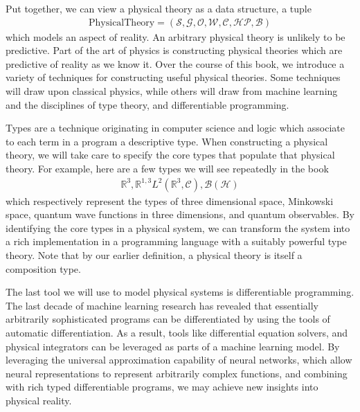 \documentclass[book.tex]{subfiles}
\begin{document}
Put together, we can view a physical theory as a data structure, a tuple 
\begin{align}
\textrm{PhysicalTheory} = (\mathcal{S}, \mathcal{G}, \mathcal{O}, \mathcal{W}, \mathcal{C}, \mathcal{HP}, \mathcal{B})
\end{align} 
which models an aspect of reality. An arbitrary physical theory is unlikely to be predictive. Part of the art of physics is constructing physical theories which are predictive of reality as we know it. Over the course of this book, we introduce a variety of techniques for constructing useful physical theories. Some techniques will draw upon classical physics, while others will draw from machine learning and the disciplines of type theory, and differentiable programming. 


Types are a technique originating in computer science and logic which associate to each term in a program a descriptive type. When constructing a physical theory, we will take care to specify the core types that populate that physical theory. For example, here are a few types we will see repeatedly in the book
\begin{align}
    \mathbb{R}^3, \mathbb{R}^{1,3} L^2(\mathbb{R}^3, \mathcal{C}), \mathcal{B}(\mathcal{H})
\end{align}
which respectively represent the types of three dimensional space, Minkowski space, quantum wave functions in three dimensions, and quantum observables. By identifying the core types in a physical system, we can transform the system into a rich implementation in a programming language with a suitably powerful type theory. Note that by our earlier definition, a physical theory is itself a composition type.

The last tool we will use to model physical systems is differentiable programming. The last decade of machine learning research has revealed that essentially arbitrarily sophisticated programs can be differentiated by using the tools of automatic differentiation. As a result, tools like differential equation solvers, and physical integrators can be leveraged as parts of a machine learning model. By leveraging the universal approximation capability of neural networks, which allow neural representations to represent arbitrarily complex functions, and combining with rich typed differentiable programs, we may achieve new insights into physical reality.

\end{document}
